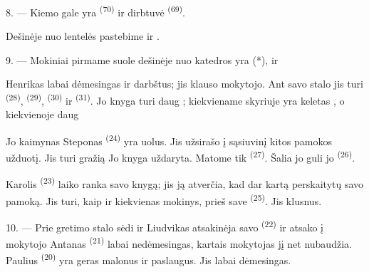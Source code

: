 8. --- Kiemo gale yra  \textsuperscript{(70)} ir
dirbtuvė  \textsuperscript{(69)}.

Dešinėje nuo lentelės pastebime  ir 
.


\VUsaut{2.4mm}

\VUsaut{3.0mm}

9. --- Mokiniai pirmame suole dešinėje nuo katedros yra  (*),
 ir 

Henrikas labai dėmesingas ir darbštus; jis klauso mokytojo. Ant savo stalo jis turi
 \textsuperscript{(28)},  \textsuperscript{(29)},
 \textsuperscript{(30)} ir  \textsuperscript{(31)}. Jo
knyga turi daug ; kiekviename skyriuje yra keletas
, o kiekvienoje  daug 

Jo kaimynas Steponas \textsuperscript{(24)} yra uolus. Jis užsirašo į sąsiuvinį kitos
pamokos užduotį. Jis turi gražią  Jo knyga uždaryta. Matome tik
 \textsuperscript{(27)}. Šalia jo guli jo 
\textsuperscript{(26)}.

Karolis \textsuperscript{(23)} laiko ranka savo knygą; jis ją atverčia, kad dar kartą
perskaitytų savo pamoką. Jis turi, kaip ir kiekvienas mokinys, prieš save
 \textsuperscript{(25)}. Jis klusnus.

10. --- Prie gretimo stalo sėdi  ir 
Liudvikas atsakinėja savo  \textsuperscript{(22)} ir atsako į mokytojo
 Antanas \textsuperscript{(21)} labai nedėmesingas, kartais
mokytojas jį net nubaudžia. Paulius \textsuperscript{(20)} yra geras 
malonus ir paslaugus. Jis labai dėmesingas.

